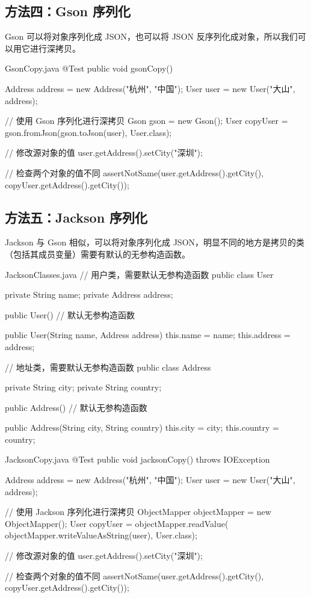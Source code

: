\subsection{方法四：Gson 序列化}
Gson 可以将对象序列化成 JSON，也可以将 JSON 反序列化成对象，所以我们可以用它进行深拷贝。

\begin{codeblock}[Java]{GsonCopy.java}
@Test
public void gsonCopy() {
    Address address = new Address("杭州", "中国");
    User user = new User("大山", address);

    // 使用 Gson 序列化进行深拷贝
    Gson gson = new Gson();
    User copyUser = gson.fromJson(gson.toJson(user), User.class);

    // 修改源对象的值
    user.getAddress().setCity("深圳");

    // 检查两个对象的值不同
    assertNotSame(user.getAddress().getCity(),
        copyUser.getAddress().getCity());
}
\end{codeblock}

\subsection{方法五：Jackson 序列化}
Jackson 与 Gson 相似，可以将对象序列化成 JSON，明显不同的地方是拷贝的类（包括其成员变量）需要有默认的无参构造函数。

\begin{codeblock}[Java]{JacksonClasses.java}
// 用户类，需要默认无参构造函数
public class User {
    private String name;
    private Address address;

    public User() {} // 默认无参构造函数

    public User(String name, Address address) {
        this.name = name;
        this.address = address;
    }
}

// 地址类，需要默认无参构造函数
public class Address {
    private String city;
    private String country;

    public Address() {} // 默认无参构造函数

    public Address(String city, String country) {
        this.city = city;
        this.country = country;
    }
}
\end{codeblock}

\begin{codeblock}[Java]{JacksonCopy.java}
@Test
public void jacksonCopy() throws IOException {
    Address address = new Address("杭州", "中国");
    User user = new User("大山", address);

    // 使用 Jackson 序列化进行深拷贝
    ObjectMapper objectMapper = new ObjectMapper();
    User copyUser = objectMapper.readValue(
        objectMapper.writeValueAsString(user), User.class);

    // 修改源对象的值
    user.getAddress().setCity("深圳");

    // 检查两个对象的值不同
    assertNotSame(user.getAddress().getCity(),
        copyUser.getAddress().getCity());
}
\end{codeblock}

